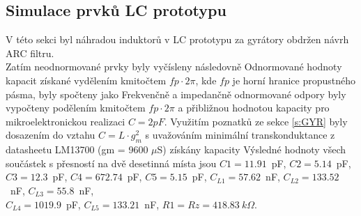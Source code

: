 \subsection{Simulace prvků LC prototypu}\label{s:ARC}
V této sekci byl náhradou induktorů v LC prototypu za gyrátory obdržen návrh ARC filtru.\\
Zatím neodnormované prvky byly vyčísleny následovně
\noindent Odnormované hodnoty kapacit získané vydělením kmitočtem $fp \cdot 2 \pi$, kde $fp$ je horní hranice propustného pásma, byly spočteny jako
\noindent Frekvenčně a impedančně odnormované odpory byly vypočteny podělením kmitočtem $fp \cdot 2 \pi$ a přibližnou hodnotou kapacity pro mikroelektronickou realizaci $C = 2 pF$.
\noindent Využitím poznatků ze sekce \ref{s:GYR} byly dosazením do vztahu $C = L \cdot g_m^2$ s uvažováním minimální transkonduktance z datasheetu LM13700 (gm = 9600 $\mu$S) získány kapacity 
\noindent Výsledné hodnoty všech součástek s přesností na dvě desetinná místa jsou $C1 = 11.91$~pF, $C2 = 5.14$~pF, \\$C3 = 12.3$~pF, $C4 = 672.74$~pF, $C5 = 5.15$~pF, $C_{L1} = 57.62$~nF, $C_{L2} = 133.52$~nF, $C_{L3} = 55.8$~nF, \\$C_{L4} = 1019.9$~pF, $C_{L5} = 133.21$~nF, $R1 = Rz = 418.83\ k\Omega$.
